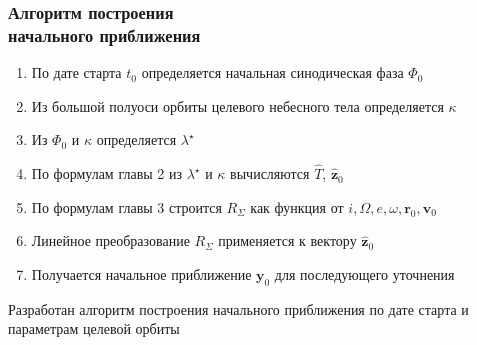 \begin{frame}[t]
    \frametitle{Алгоритм построения\\ начального приближения}
    \presentationtextsize
    \begin{enumerate}
        \item По дате старта \(t_0\) определяется начальная синодическая фаза \(\Phi_0\)
        \item Из большой полуоси орбиты целевого небесного тела определяется \(\kappa\) 
        \item Из \(\Phi_0\) и \(\kappa\) определяется \(\lambda^\star\)
        \item По формулам главы 2 из \(\lambda^\star\) и \(\kappa\) вычисляются \(\widehat T\), \(\widehat{\mathbf z}_0\)
        \item По формулам главы 3 строится \(R_\Sigma\) как функция от \(i,\Omega,e, \omega,\mathbf r_0,\mathbf v_0\)
        \item Линейное преобразование \(R_\Sigma\) применяется к вектору \(\widehat{\mathbf z}_0\)
        \item Получается начальное приближение \(\mathbf y_0\) для последующего уточнения
    \end{enumerate}
    \begin{newresult}
        Разработан алгоритм построения начального приближения по дате старта и параметрам целевой орбиты
    \end{newresult}
\end{frame}
